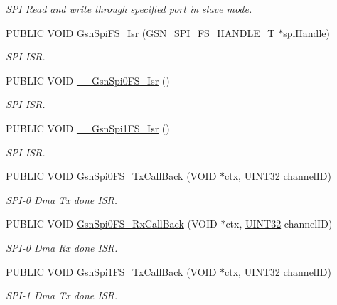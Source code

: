 \begin{DoxyCompactItemize}
\begin{DoxyCompactList}\small\item\em SPI Read and write through specified port in slave mode. \end{DoxyCompactList}\item 
PUBLIC VOID \hyperlink{a00655_gaad41750a0d70bcd3f0b7db9760e47391}{GsnSpiFS\_\-Isr} (\hyperlink{a00234}{GSN\_\-SPI\_\-FS\_\-HANDLE\_\-T} $\ast$spiHandle)
\begin{DoxyCompactList}\small\item\em SPI ISR. \end{DoxyCompactList}\item 
PUBLIC VOID \hyperlink{a00655_ga2f78053c72cf58db8c440b189eec9419}{\_\-\_\-GsnSpi0FS\_\-Isr} ()
\begin{DoxyCompactList}\small\item\em SPI ISR. \end{DoxyCompactList}\item 
PUBLIC VOID \hyperlink{a00655_gab146a94b58d609a50c8e2a86dde0b949}{\_\-\_\-GsnSpi1FS\_\-Isr} ()
\begin{DoxyCompactList}\small\item\em SPI ISR. \end{DoxyCompactList}\item 
PUBLIC VOID \hyperlink{a00655_ga7374c14d7db873665db9ab71ed2b11a2}{GsnSpi0FS\_\-TxCallBack} (VOID $\ast$ctx, \hyperlink{a00660_gae1e6edbbc26d6fbc71a90190d0266018}{UINT32} channelID)
\begin{DoxyCompactList}\small\item\em SPI-\/0 Dma Tx done ISR. \end{DoxyCompactList}\item 
PUBLIC VOID \hyperlink{a00655_ga50385774aea507126c43ccd82ecc5b37}{GsnSpi0FS\_\-RxCallBack} (VOID $\ast$ctx, \hyperlink{a00660_gae1e6edbbc26d6fbc71a90190d0266018}{UINT32} channelID)
\begin{DoxyCompactList}\small\item\em SPI-\/0 Dma Rx done ISR. \end{DoxyCompactList}\item 
PUBLIC VOID \hyperlink{a00655_ga4f0d4aeecca4c7f5ef831a80cba40e1f}{GsnSpi1FS\_\-TxCallBack} (VOID $\ast$ctx, \hyperlink{a00660_gae1e6edbbc26d6fbc71a90190d0266018}{UINT32} channelID)
\begin{DoxyCompactList}\small\item\em SPI-\/1 Dma Tx done ISR. \end{DoxyCompactList}\item 

\end{DoxyCompactItemize}
